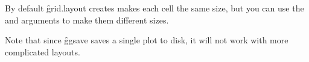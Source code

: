 % 
% 


By default \f{grid.layout} creates makes each cell the same size, but you can use the  and  arguments to make them different sizes.

Note that since \f{ggsave} saves a single \ggplot plot to disk, it will not work with more complicated layouts.



